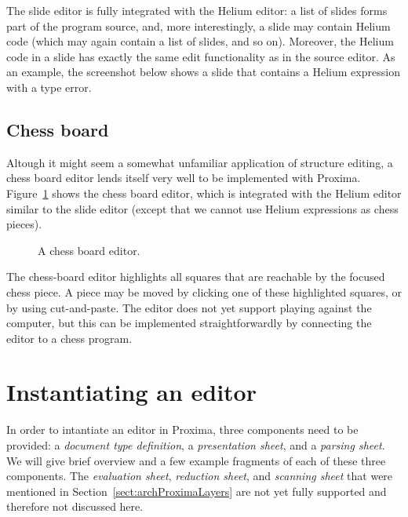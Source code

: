 
The slide editor is fully integrated with the Helium editor: a list of slides forms part of the program source, and, more interestingly, a slide may contain Helium code (which may again contain a list of slides, and so on). Moreover, the Helium code in a slide has exactly the same edit functionality as in the source editor. As an example, the screenshot below shows a slide that contains a Helium expression with a type error.

\begin{center}
\end{center}


\subsection{Chess board}

Altough it might seem a somewhat unfamiliar application of structure editing, a chess board editor lends itself very well to be implemented with Proxima.  Figure~\ref{chessBoard} shows the chess board editor, which is integrated with the Helium editor similar to the slide editor (except that we cannot use Helium expressions as chess pieces).

\begin{figure}
\begin{center}
\caption{A chess board editor.}\label{chessBoard} 
\end{center}
\end{figure}

The chess-board editor highlights all squares that are reachable by the focused chess piece. A piece may be moved by clicking one of these highlighted squares, or by using cut-and-paste. The editor does not yet support playing against the computer, but this can be implemented straightforwardly by connecting the editor to a chess program. 



%																
%																
%																
\section{Instantiating an editor} \label{sect:instantiating}

In order to intantiate an editor in Proxima, three components need to be provided: a {\em document type definition}, a {\em presentation sheet}, and a {\em parsing sheet}. We will give brief overview and a few example fragments of each of these three components. The {\em evaluation sheet}, {\em reduction sheet}, and {\em scanning sheet} that were mentioned in Section~\ref{sect:archProximaLayers} are not yet fully supported and therefore not discussed here.

